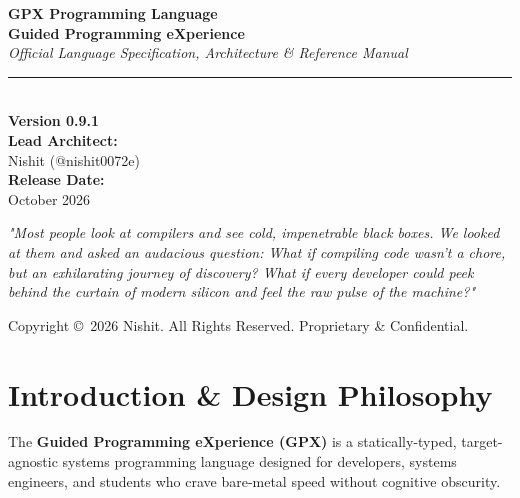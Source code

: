 \documentclass[11pt,a4paper]{report}
\begin{document}
\begin{titlepage}
    \centering
    \vspace*{1.5cm}
    
    {\Huge \bfseries \color{gpxprimary} GPX Programming Language}\\[0.5cm]
    {\LARGE \textbf{Guided Programming eXperience}}\\[0.2cm]
    {\large \textit{Official Language Specification, Architecture \& Reference Manual}}\\[1.5cm]
    
    \rule{0.6\textwidth}{1.5pt}\\[1.5cm]
    
    {\large \textbf{Version 0.9.1}}\\[0.8cm]
    
    \textbf{Lead Architect:}\\
    Nishit (@nishit0072e)\\[0.4cm]
    
    \textbf{Release Date:}\\
    October 2026\\[2cm]
    
    \begin{tcolorbox}[colback=gpxbg,colframe=gpxprimary,arc=3mm,width=0.85\textwidth]
        \centering
        \small
        \textit{"Most people look at compilers and see cold, impenetrable black boxes. We looked at them and asked an audacious question: What if compiling code wasn't a chore, but an exhilarating journey of discovery? What if every developer could peek behind the curtain of modern silicon and feel the raw pulse of the machine?"}
    \end{tcolorbox}
    
    \vfill
    {\footnotesize Copyright \copyright\ 2026 Nishit. All Rights Reserved. Proprietary \& Confidential.}
\end{titlepage}

\tableofcontents
\newpage

\chapter{Introduction \& Design Philosophy}

The \textbf{Guided Programming eXperience (GPX)} is a statically-typed, target-agnostic systems programming language designed for developers, systems engineers, and students who crave bare-metal speed without cognitive obscurity.
\end{document}
